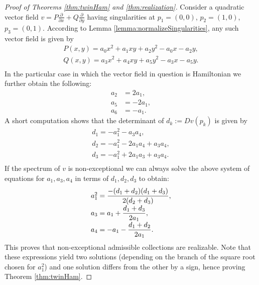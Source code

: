 \documentclass[phd,tocprelim]{cornell}
\begin{document}
\begin{proof}[Proof of Theorems \ref*{thm:twinHam} and \ref*{thm:realization}]
Consider a quadratic vector field $v=P\frac{\partial}{\partial x}+Q\frac{\partial}{\partial y}$ having singularities at $p_1=(0,0)$, $p_2=(1,0)$, $p_3=(0,1)$. According to Lemma \ref{lemma:normalizeSingularities}, any such vector field is given by 
\begin{equation*}
\begin{array}{l}
 P(x,y) = a_0x^2+a_1xy+a_2y^2-a_0x-a_2y,  \\ 
 Q(x,y) = a_3x^2+a_4xy+a_5y^2-a_3x-a_5y. \\
\end{array}
\end{equation*}
In the particular case in which the vector field in question is Hamiltonian we further obtain the following:
\begin{align*}
a_2 &= 2a_1, \\
a_5 &= -2a_1, \\
a_6 &= -a_1.
\end{align*}
A short computation shows that the determinant of $d_k:=Dv(p_k)$ is given by
\begin{equation}\label{eq:detsHam}
\begin{array}{l} 
d_1 = -a_1^2-a_3a_4, \\
d_2 = -a_1^2-2a_1a_4+a_3a_4, \\
d_3 = -a_1^2+2a_1a_3+a_3a_4. \\
\end{array}
\end{equation}
If the spectrum of $v$ is non-exceptional we can always solve the above system of equations for $a_1,a_3,a_4$ in terms of $d_1,d_2,d_3$ to obtain:
\begin{equation*}
  \arraycolsep=1pt\def\arraystretch{1.8}
\begin{array}{l} 
a_1^2 = \displaystyle\frac{-(d_1+d_2)(d_1+d_3)}{2(d_2+d_3)}, \\
a_3   = a_1+\displaystyle\frac{d_1+d_3}{2a_1}, \\
a_4   = -a_1-\displaystyle\frac{d_1+d_2}{2a_1}. \\
\end{array}
\end{equation*}
This proves that non-exceptional admissible collections are realizable. Note that these expressions yield two solutions (depending on the branch of the square root chosen for $a_1^2$) and one solution differs from the other by a sign, hence proving Theorem \ref*{thm:twinHam}.


\end{proof}
\end{document}
